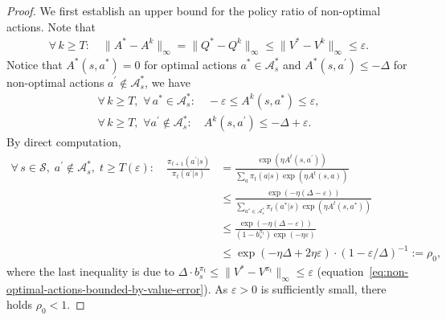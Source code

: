 \documentclass[10pt]{article}
\newcommand{\calA}{\mathcal{A}}
\newcommand{\calS}{\mathcal{S}}
\theoremstyle{plain}
\theoremstyle{definition}
\begin{document}
\begin{proof}
    We first establish an upper bound for the policy ratio of non-optimal actions. Note that
    \begin{align*}
        \forall\, k \geq T: \quad \| A^* - A^k \|_\infty = \| Q^* - Q^k \|_\infty \leq \| V^* - V^k \|_\infty \leq \varepsilon.
    \end{align*}
    Notice that $A^*(s,a^*) = 0$ for optimal actions $a^*\in\calA^*_s$ and $A^*(s,a^\prime) \leq -\Delta$ for non-optimal actions $a^\prime \not \in \calA^*_s$, we have
    \begin{equation}\label{eq:bounds-for-A-k}
    \begin{aligned}
        \forall\, k \geq T,\,\, \forall \, a^*\in\calA^*_s: \quad -\varepsilon \leq  A^k(s,a^*)  \leq \varepsilon, \\
        \forall\, k \geq T , \,\, \forall a^\prime\not\in\calA^*_s: \quad A^k(s,a^\prime) \leq -\Delta + \varepsilon.
    \end{aligned}
    \end{equation}
    By direct computation,
    \begin{align*}
        \forall\, s\in\calS, \; a^\prime \not\in\calA^*_s, \; t\geq T(\varepsilon): \quad \frac{\pi_{t+1}(a^\prime|s)}{\pi_t(a^\prime|s)} &= \frac{\exp (\eta A^t(s, a^\prime))}{\sum_a \pi_t(a|s) \exp(\eta A^t(s,a))} \\
        &\leq \frac{\exp(-\eta (\Delta - \varepsilon))}{\sum_{a^* \in\calA^*_s} \pi_t(a^*|s) \exp (\eta A^t(s,a^*))} \\
        &\leq \frac{\exp(-\eta (\Delta - \varepsilon))}{(1-b_s^{\pi_t}) \exp(-\eta\varepsilon)} \\
        &\leq \exp(-\eta\Delta + 2\eta\varepsilon)\cdot (1-\varepsilon/\Delta)^{-1} := \rho_0,
    \end{align*}
    where the last inequality is due to $\Delta \cdot b_s^{\pi_t} \leq \| V^* - V^{\pi_t} \|_\infty \leq \varepsilon$ (equation~\eqref{eq:non-optimal-actions-bounded-by-value-error}). As $\varepsilon > 0$ is sufficiently small, there holds $\rho_0 < 1$.


\end{proof}
\end{document}
